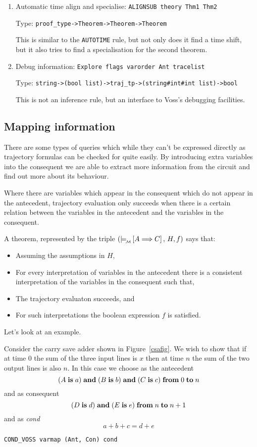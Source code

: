 \begin{enumerate}
\item Automatic time align and specialise:
{\tt ALIGNSUB  theory Thm1 Thm2}

Type: {\tt proof\_type->Theorem->Theorem->Theorem}

This is similar to the {\tt AUTOTIME} rule, but not only does
it find a time shift, but it also tries to find a specialisation
for the second theorem.


\item Debug information: {\tt Explore flags varorder Ant tracelist}

Type: {\tt string->(bool list)->traj\_tp->(string\#int\#int list)->bool}

This is not an inference rule, but an interface to Voss's debugging
facilities.


\end{enumerate}

\subsection{Mapping information}

There are some types of queries which while they can't be
expressed directly as trajectory formulas can be checked for
quite easily. By introducing extra variables into the
consequent we are able to extract more information from
the circuit and find out more about its behaviour.

Where there are variables which appear in the consequent
which do not appear in the antecedent, trajectory evaluation
only succeeds when there is a certain relation between the
variables in the antecedent and the variables in the
consequent.

A theorem, represented by the triple $(\models_{\!{\mbox{}_{\cal M}}}\! \left[A\Longrightarrow C\right],\,H,f)$
says that:
\begin{itemize}
\item
Assuming the assumptions in  $H$,
\item
For every interpretation of variables in the antecedent
there is a consistent interpretation of the variables
in the consequent such that,
\item
The trajectory evaluaton succeeds, and
\item
For such interpretations the boolean expression $f$ is
satisfied.
\end{itemize}

\noindent
Let's look at an example. 

\begin{example}
\rm
Consider the carry save adder shown in Figure~\ref{csafig}.
We wish to show that if at time 0 the sum of the three
input lines is $x$ then at time $n$ the sum of the two output
lines is also $n$. In this case we choose as the antecedent
$$(A \;\mbox{\bf is}\; a) \;\mbox{\bf and}\; (B \;\mbox{\bf is}\; b) \;\mbox{\bf and}\; (C \;\mbox{\bf is}\; c) \;\mbox{\bf from}\; 0 \;\mbox{\bf to}\; n$$ and
as consequent
$$(D \;\mbox{\bf is}\; d) \;\mbox{\bf and}\; (E \;\mbox{\bf is}\; e) \;\mbox{\bf from}\; n \;\mbox{\bf to}\; n+1$$ and as {\em cond}
$$a+b+c=d+e$$

{\tt COND\_VOSS varmap (Ant, Con) cond}
\end{example}



